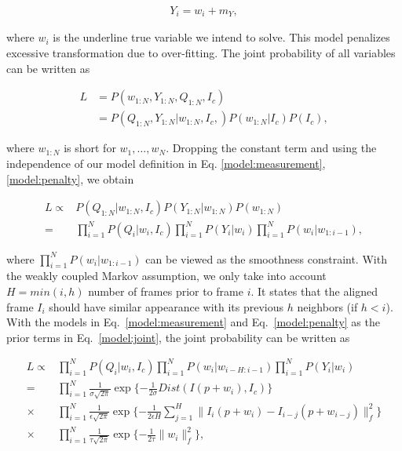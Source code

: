 \documentclass[10pt,journal]{IEEEtran}
\begin{document}
\begin{align}
\label{model:penalty}
Y_i=w_i+m_Y,
\end{align}

\noindent where $w_i$ is the underline true variable we intend to solve. This model penalizes excessive transformation due to over-fitting. The joint probability of all variables can be written as

\begin{align}
L&=P(w_{1:N},Y_{1:N},Q_{1:N},I_c) \\
 &=P(Q_{1:N},Y_{1:N}|w_{1:N},I_c,)P(w_{1:N}|I_c)P(I_c),
\end{align}

\noindent where $w_{1:N}$ is short for $w_1,\ldots,w_N$. Dropping the constant term and using the independence of our model definition in Eq. \ref{model:measurement}, \ref{model:penalty}, we obtain

\begin{align}
L\propto & P(Q_{1:N}|w_{1:N},I_c) P(Y_{1:N}|w_{1:N}) P(w_{1:N}) \\
				=& \prod_{i=1}^N{P(Q_i|w_i,I_c)} \prod_{i=1}^N{P(Y_i|w_i)} \prod_{i=1}^N {P(w_i|w_{1:i-1})},
\label{model:joint}
\end{align}

\noindent where $\prod_{i=1}^N {P(w_i|w_{1:i-1})}$ can be viewed as the smoothness constraint. With the weakly coupled Markov assumption, we only take into account $H=min(i,h)$ number of frames prior to frame $i$. It states that the aligned frame $I_i$ should have similar appearance with its previous $h$ neighbors (if $h<i$). With the models in Eq.~\ref{model:measurement} and Eq.~\ref{model:penalty} as the prior terms in Eq.~\ref{model:joint}, the joint probability can be written as 

\begin{align}
L\propto & \prod_{i=1}^N{P(Q_i|w_i,I_c)} \prod_{i=1}^N {P(w_i|w_{i-H:i-1})} \prod_{i=1}^N{P(Y_i|w_i)} \\
\label{data_exp}
				=& \prod_{i=1}^N \frac{1}{\sigma \sqrt{2\pi}} \exp\{-\frac{1}{2\sigma}Dist(I(p+w_i),I_c)\}  \\
\label{smooth_exp}
				\times &\prod_{i=1}^N \frac{1}{\epsilon \sqrt{2\pi}} \exp\{-\frac{1}{2\epsilon H}\sum_{j=1}^{H}\parallel{I_i(p+w_i)-I_{i-j}(p+w_{i-j})}\parallel_f^2\} \\
\label{penalty_exp}
				\times &\prod_{i=1}^N \frac{1}{\tau \sqrt{2\pi}} \exp\{-\frac{1}{2\tau}\parallel{w_i}\parallel_f^2\},
\end{align}
\end{document}

